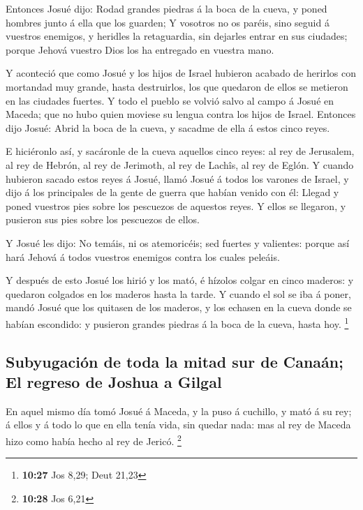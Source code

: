  Entonces Josué dijo: Rodad grandes piedras á la boca de la
cueva, y poned hombres junto á ella que los guarden;  Y
vosotros no os paréis, sino seguid á vuestros enemigos, y heridles la
retaguardia, sin dejarles entrar en sus ciudades; porque Jehová vuestro
Dios los ha entregado en vuestra mano.

 Y aconteció que como Josué y los hijos de Israel hubieron
acabado de herirlos con mortandad muy grande, hasta destruirlos, los que
quedaron de ellos se metieron en las ciudades fuertes.  Y
todo el pueblo se volvió salvo al campo á Josué en Maceda; que no hubo
quien moviese su lengua contra los hijos de Israel. 
Entonces dijo Josué: Abrid la boca de la cueva, y sacadme de ella á
estos cinco reyes.

 E hiciéronlo así, y sacáronle de la cueva aquellos cinco
reyes: al rey de Jerusalem, al rey de Hebrón, al rey de Jerimoth, al rey
de Lachîs, al rey de Eglón.  Y cuando hubieron sacado estos
reyes á Josué, llamó Josué á todos los varones de Israel, y dijo á los
principales de la gente de guerra que habían venido con él: Llegad y
poned vuestros pies sobre los pescuezos de aquestos reyes. Y ellos se
llegaron, y pusieron sus pies sobre los pescuezos de ellos.

 Y Josué les dijo: No temáis, ni os atemoricéis; sed
fuertes y valientes: porque así hará Jehová á todos vuestros enemigos
contra los cuales peleáis.

 Y después de esto Josué los hirió y los mató, é hízolos
colgar en cinco maderos: y quedaron colgados en los maderos hasta la
tarde.  Y cuando el sol se iba á poner, mandó Josué que los
quitasen de los maderos, y los echasen en la cueva donde se habían
escondido: y pusieron grandes piedras á la boca de la cueva, hasta hoy.
\footnote{\textbf{10:27} Jos 8,29; Deut 21,23}

\hypertarget{subyugaciuxf3n-de-toda-la-mitad-sur-de-canauxe1n-el-regreso-de-joshua-a-gilgal}{%
\subsection{Subyugación de toda la mitad sur de Canaán; El regreso de
Joshua a
Gilgal}\label{subyugaciuxf3n-de-toda-la-mitad-sur-de-canauxe1n-el-regreso-de-joshua-a-gilgal}}

 En aquel mismo día tomó Josué á Maceda, y la puso á
cuchillo, y mató á su rey; á ellos y á todo lo que en ella tenía vida,
sin quedar nada: mas al rey de Maceda hizo como había hecho al rey de
Jericó. \footnote{\textbf{10:28} Jos 6,21}

